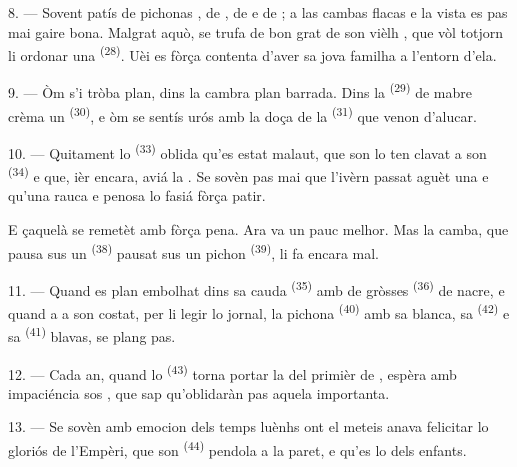 8. --- Sovent patís de pichonas , de , de
 e de ; a las cambas flacas e la vista
es pas mai gaire bona. Malgrat aquò, se trufa de bon grat de son vièlh
, que vòl totjorn li ordonar una 
\textsuperscript{(28)}. Uèi es fòrça contenta d'aver sa jova familha a l'entorn
d'ela.

9. --- Òm s'i tròba plan, dins la cambra plan barrada. Dins la 
\textsuperscript{(29)} de mabre crèma un 
\textsuperscript{(30)}, e òm se sentís urós amb la doça  de la
 \textsuperscript{(31)} que venon d'alucar.

\VUsaut{4.2mm}
\VUsaut{3.0mm}

10. --- Quitament lo  \textsuperscript{(33)} oblida qu'es estat
malaut, que son  lo ten clavat a son 
\textsuperscript{(34)} e que, ièr encara, aviá la . Se sovèn pas mai que l'ivèrn passat aguèt una 
e qu'una  rauca e penosa lo fasiá fòrça patir.

E çaquelà se remetèt amb fòrça pena. Ara va un pauc melhor. Mas la camba, que
pausa sus un  \textsuperscript{(38)} pausat sus un pichon
 \textsuperscript{(39)}, li fa encara mal.

11. --- Quand es plan embolhat dins sa cauda 
\textsuperscript{(35)} amb de gròsses  \textsuperscript{(36)} de
nacre, e quand a a son costat, per li legir lo jornal, la pichona
 \textsuperscript{(40)} amb sa  blanca, sa
 \textsuperscript{(42)} e sa 
\textsuperscript{(41)} blavas, se plang pas.

12. --- Cada an, quand lo  \textsuperscript{(43)} torna portar
la  del primièr de , espèra amb impaciéncia sos
, que sap qu'oblidaràn pas aquela  importanta.

13. --- Se sovèn amb emocion dels temps luènhs ont el meteis anava felicitar lo
gloriós  de l'Empèri, que son 
\textsuperscript{(44)} pendola a la paret, e qu'es lo  dels
enfants.
\VUsaut{6.0mm}
\VUfilet{22mm}
